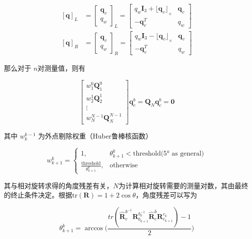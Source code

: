 \documentclass[12pt,a4paper]{article}
\begin{document}
\begin{equation}
\begin{aligned}
{[\mathbf{q}]}_L &=
{\begin{bmatrix} \mathbf{q}_v \\ q_w \end{bmatrix}}_L =
\begin{bmatrix}
{q}_{w} \mathbf{I}_{3} + {\lfloor \mathbf{q}_{v}\rfloor}_{\times} & \mathbf{q}_{v}\\
-\mathbf{q}_{v}^T & {q}_{w}
\end{bmatrix} \\
{[\mathbf{q}]}_R &=
{\begin{bmatrix} \mathbf{q}_v \\ q_w \end{bmatrix}}_R =
\begin{bmatrix}
{q}_{w} \mathbf{I}_{3} - {\lfloor \mathbf{q}_{v} \rfloor}_{\times} & \mathbf{q}_{v}\\
-\mathbf{q}_{v}^T & {q}_{w}
\end{bmatrix}
\end{aligned}
\end{equation}

那么对于 $n$对测量值，则有

\begin{equation}
\begin{bmatrix}
w^{0}_{1} \mathbf{Q}^{0}_{1} \\
w^{1}_{2} \mathbf{Q}^{1}_{2} \\
\vdots \\
w^{N-1}_{N} \mathbf{Q}^{N-1}_{N}
\end{bmatrix} 
\mathbf{q}^{b}_{c}
=
\mathbf{Q}_{N} \mathbf{q}^{b}_{c} = \boldsymbol{0}
\end{equation}

其中 $w^{k-1}_{k}$ 为外点剔除权重（Huber鲁棒核函数）

\begin{equation}
w^{k}_{k+1}
=
\left\{\begin{matrix}
1, & {\theta}^{k}_{k+1} < \text{threshold(5° as general)} \\
\frac{\text{threshold}}{\theta^{k}_{k+1}}, & \text{otherwise}
\end{matrix}\right.
\end{equation}

其与相对旋转求得的角度残差有关，$N$为计算相对旋转需要的测量对数，其由最终的终止条件决定。根据$\text{tr}(\mathbf{R}) = 1+2 \cos \theta$，角度残差可以写为

\begin{equation}
{\theta}^{k}_{k+1}
=
\arccos
\bigg(
  \frac{tr(\hat{\mathbf{R}}^{b^{-1}}_{c} \mathbf{R}^{b_{k}^{-1}}_{b_{k+1}} \hat{\mathbf{R}}^{b}_{c} \mathbf{R}^{c_{k}}_{c_{k+1}} )-1}{2}
\bigg)
\end{equation}
\end{document}
